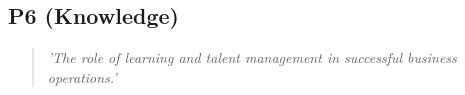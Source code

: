 \subsection{P6 (Knowledge)}

  \begin{quote}
    \textit{'The role of learning and talent
    management in successful business operations.'}
  \end{quote}

\newpage